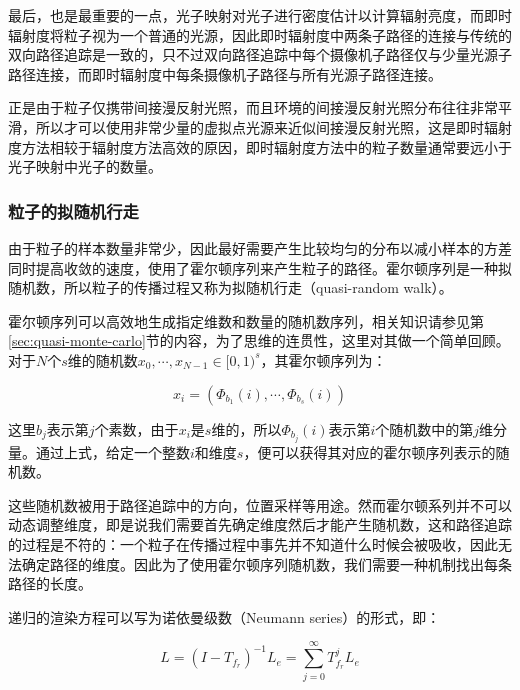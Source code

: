 最后，也是最重要的一点，光子映射对光子进行密度估计以计算辐射亮度，而即时辐射度将粒子视为一个普通的光源，因此即时辐射度中两条子路径的连接与传统的双向路径追踪是一致的，只不过双向路径追踪中每个摄像机子路径仅与少量光源子路径连接，而即时辐射度中每条摄像机子路径与所有光源子路径连接。

正是由于粒子仅携带间接漫反射光照，而且环境的间接漫反射光照分布往往非常平滑，所以才可以使用非常少量的虚拟点光源来近似间接漫反射光照，这是即时辐射度方法相较于辐射度方法高效的原因，即时辐射度方法中的粒子数量通常要远小于光子映射中光子的数量。




\subsubsection{粒子的拟随机行走}
由于粒子的样本数量非常少，因此最好需要产生比较均匀的分布以减小样本的方差同时提高收敛的速度，\cite{a:InstantRadiosity}使用了霍尔顿序列来产生粒子的路径。霍尔顿序列是一种拟随机数，所以粒子的传播过程又称为拟随机行走（quasi-random walk）\cite{a:Quasi-MonteCarloRadiosity}。

霍尔顿序列可以高效地生成指定维数和数量的随机数序列，相关知识请参见第\ref{sec:quasi-monte-carlo}节的内容，为了思维的连贯性，这里对其做一个简单回顾。对于$N$个$s$维的随机数$x_0,\cdots,x_{N-1}\in [0,1)^{s}$，其霍尔顿序列为：

\begin{equation}\label{e:ir-halton-sequence}
	x_i=(\Phi_{b_1}(i),\cdots,\Phi_{b_s}(i))
\end{equation}

\noindent 这里$b_j$表示第$j$个素数，由于$x_i$是$s$维的，所以$\Phi_{b_j}(i)$表示第$i$个随机数中的第$j$维分量。通过上式，给定一个整数$i$和维度$s$，便可以获得其对应的霍尔顿序列表示的随机数。

这些随机数被用于路径追踪中的方向，位置采样等用途。然而霍尔顿系列并不可以动态调整维度，即是说我们需要首先确定维度然后才能产生随机数，这和路径追踪的过程是不符的：一个粒子在传播过程中事先并不知道什么时候会被吸收，因此无法确定路径的维度。因此为了使用霍尔顿序列随机数，我们需要一种机制找出每条路径的长度。

递归的渲染方程可以写为诺依曼级数（Neumann series）的形式，即：

\begin{equation}\label{e:ir-transport-operator}
	L=(I-T_{f_r})^{-1}L_e=\sum^{\infty}_{j=0}T^{j}_{f_r}L_e
\end{equation}


